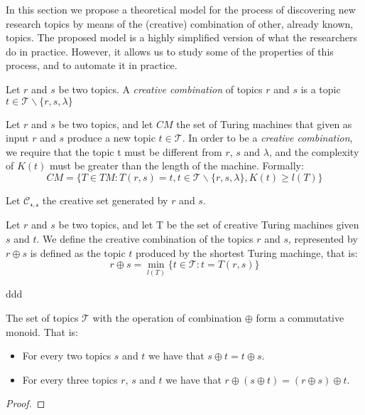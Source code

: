 In this section we propose a theoretical model for the process of discovering new research topics by means of the (creative) combination of other, already known, topics. The proposed model is a highly simplified version of what the researchers do in practice. However, it allows us to study some of the properties of this process, and to automate it in practice.

\begin{definition}
Let $r$ and $s$ be two topics. A \emph{creative combination} of topics $r$ and $s$ is a topic $t \in \mathcal{T} \backslash \{r, s, \lambda\}$
\end{definition}

Let $r$ and $s$ be two topics, and let $CM$ the set of Turing machines that given as input $r$ and $s$ produce a new topic $t \in \mathcal{T}$. In order to be a \emph{creative combination}, we require that the topic t must be different from $r$, $s$ and $\lambda$, and the complexity of $K(t)$ must be greater than the length of the machine. Formally:
\[
CM = \{ T \in TM : T(r, s) = t, t \in \mathcal{T} \backslash \{r, s, \lambda\}, K(t) \geq l(T) \}
\]

Let $\mathcal{C_{r,s}}$ the creative set generated by $r$ and $s$.


\begin{definition}

\end{definition}



\begin{definition}
Let $r$ and $s$ be two topics, and let T be the set of creative Turing machines given $s$ and $t$. We define the creative combination of the topics $r$ and $s$, represented by $r \oplus s$ is defined as the topic $t$ produced by the shortest Turing machinge, that is:
\[
r \oplus s = \min_{l(T)} \{ t \in \mathcal{T} : t = T(r,s) \}
\]
\end{definition}

ddd

\begin{proposition}
The set of topics $\mathcal{T}$ with the operation of combination $\oplus$ form a commutative monoid. That is:
\begin{itemize}
\item For every two topics $s$ and $t$ we have that $s \oplus t = t \oplus s$.
\item  For every three topics $r$, $s$ and $t$ we have that $r \oplus \left( s \oplus t \right) = \left( r \oplus s \right) \oplus t$.
\end{itemize}
\end{proposition}
\begin{proof}
\end{proof}

